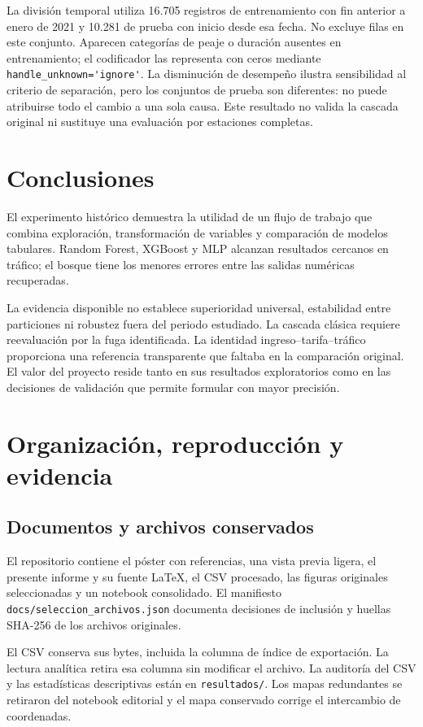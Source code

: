 \documentclass[11pt,a4paper]{article}
\newcommand{\campo}[1]{\nolinkurl{#1}}
\begin{document}
La división temporal utiliza 16.705 registros de entrenamiento con fin anterior a enero de 2021 y 10.281 de prueba con inicio desde esa fecha. No excluye filas en este conjunto. Aparecen categorías de peaje o duración ausentes en entrenamiento; el codificador las representa con ceros mediante \campo{handle_unknown='ignore'}. La disminución de desempeño ilustra sensibilidad al criterio de separación, pero los conjuntos de prueba son diferentes: no puede atribuirse todo el cambio a una sola causa. Este resultado no valida la cascada original ni sustituye una evaluación por estaciones completas.

\section{Conclusiones}
El experimento histórico demuestra la utilidad de un flujo de trabajo que combina exploración, transformación de variables y comparación de modelos tabulares. Random Forest, XGBoost y MLP alcanzan resultados cercanos en tráfico; el bosque tiene los menores errores entre las salidas numéricas recuperadas.

La evidencia disponible no establece superioridad universal, estabilidad entre particiones ni robustez fuera del periodo estudiado. La cascada clásica requiere reevaluación por la fuga identificada. La identidad ingreso--tarifa--tráfico proporciona una referencia transparente que faltaba en la comparación original. El valor del proyecto reside tanto en sus resultados exploratorios como en las decisiones de validación que permite formular con mayor precisión.
\par\medskip

\clearpage\appendix\small
\section{Organización, reproducción y evidencia}
\subsection{Documentos y archivos conservados}
El repositorio contiene el póster con referencias, una vista previa ligera, el presente informe y su fuente LaTeX, el CSV procesado, las figuras originales seleccionadas y un notebook consolidado. El manifiesto \campo{docs/seleccion_archivos.json} documenta decisiones de inclusión y huellas SHA-256 de los archivos originales.

El CSV conserva sus bytes, incluida la columna de índice de exportación. La lectura analítica retira esa columna sin modificar el archivo. La auditoría del CSV y las estadísticas descriptivas están en \campo{resultados/}. Los mapas redundantes se retiraron del notebook editorial y el mapa conservado corrige el intercambio de coordenadas.
\end{document}
